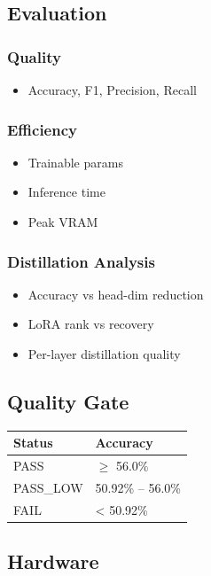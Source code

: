 \subsection{Evaluation}

\subsubsection{Quality}
\begin{itemize}
\item Accuracy, F1, Precision, Recall

\end{itemize}
\subsubsection{Efficiency}
\begin{itemize}
\item Trainable params
\item Inference time
\item Peak VRAM

\end{itemize}
\subsubsection{Distillation Analysis}
\begin{itemize}
\item Accuracy vs head-dim reduction
\item LoRA rank vs recovery
\item Per-layer distillation quality

\end{itemize}
\subsection{Quality Gate}

\begin{table}[H]
\centering
\small
\begin{tabular}{ll}
\toprule
\textbf{Status} & \textbf{Accuracy} \\
\midrule
PASS & $\ge$ 56.0\% \\
PASS\_LOW & 50.92\% -- 56.0\% \\
FAIL & < 50.92\% \\
\bottomrule
\end{tabular}
\end{table}

\subsection{Hardware}

